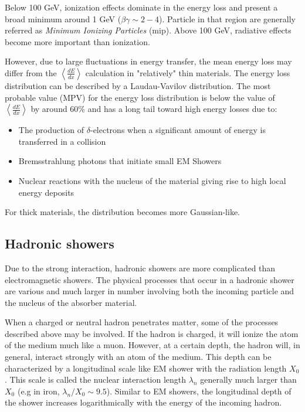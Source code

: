 Below 100 GeV, ionization effects dominate in the energy loss and present a broad minimum around 1 GeV ($\beta\gamma \sim 2-4$). Particle in that region are generally referred as \textit{Minimum Ionizing Particles} (\acrshort{mip}). Above 100 GeV, radiative effects become more important than ionization.

However, due to large fluctuations in energy transfer, the mean energy loss may differ from the $\left<\frac{dE}{dx}\right>$ calculation in "relatively" thin materials. The energy loss distribution can be described by a Laudau-Vavilov distribution. The most probable value (MPV) for the energy loss distribution is below the value of $\left<\frac{dE}{dx}\right>$ by around 60\% and has a long tail toward high energy losses due to:
\begin{itemize}
  \item The production of $\delta$-electrons when a significant amount of energy is transferred in a collision
  \item Bremsstrahlung photons that initiate small EM Showers
  \item Nuclear reactions with the nucleus of the material giving rise to high local energy deposits
\end{itemize}
For thick materials, the distribution becomes more Gaussian-like.

\subsection{Hadronic showers}
\label{subsec:HadShowers}

Due to the strong interaction, hadronic showers are more complicated than electromagnetic showers. The physical processes that occur in a hadronic shower are various and much larger in number involving both the incoming particle and the nucleus of the absorber material.

When a charged or neutral hadron penetrates matter, some of the processes described above may be involved. If the hadron is charged, it will ionize the atom of the medium much like a muon. However, at a certain depth, the hadron will, in general, interact strongly with an atom of the medium. This depth can be characterized by a longitudinal scale like EM shower with the radiation length $X_0$. This scale is called the nuclear interaction length $\lambda_n$ generally much larger than $X_0$ (e.g in iron, $\lambda_n/X_0 \sim 9.5$). Similar to EM showers, the longitudinal depth of the shower increases logarithmically with the energy of the incoming hadron.

